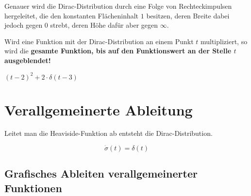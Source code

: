 \documentclass[12pt, a4paper]{scrreprt}
\begin{document}
Genauer wird die Dirac-Distribution durch eine Folge von Rechteckimpulsen hergeleitet, die den konstanten Flächeninhalt \(1\) besitzen, deren Breite dabei jedoch gegen \(0\) strebt, deren Höhe dafür aber gegen \(\infty\).

\begin{minipage}{.5\textwidth}
  Wird eine Funktion mit der Dirac-Distribution an einem Punkt \(t\) multipliziert, so wird die \textbf{gesamte Funktion, bis auf den Funktionswert an der Stelle \(t\) ausgeblendet!}
\end{minipage}\hfill%
\begin{minipage}{.5\textwidth}
  \centering
  {\footnotesize \((t-2)^2+2 \cdot \delta(t-3)\)}
\end{minipage}

\section{Verallgemeinerte Ableitung}

Leitet man die Heaviside-Funktion ab entsteht die Dirac-Distribution.

\begin{framed}
  \[
    \dot{\sigma} (t) = \delta (t)
  \]
\end{framed}

\subsection{Grafisches Ableiten verallgemeinerter Funktionen}
\end{document}
